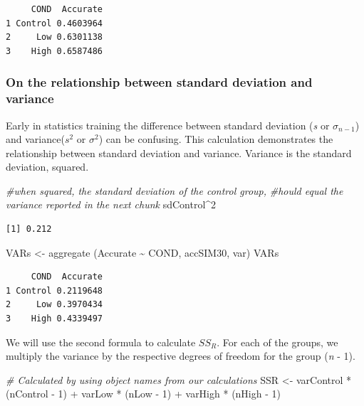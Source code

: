 \documentclass[
  11pt,
]{book}
\newenvironment{Shaded}{\begin{snugshade}}{\end{snugshade}}
\newcommand{\CommentTok}[1]{\textcolor[rgb]{0.56,0.35,0.01}{\textit{#1}}}
\newcommand{\DecValTok}[1]{\textcolor[rgb]{0.00,0.00,0.81}{#1}}
\newcommand{\FunctionTok}[1]{\textcolor[rgb]{0.00,0.00,0.00}{#1}}
\newcommand{\NormalTok}[1]{#1}
\newcommand{\OtherTok}[1]{\textcolor[rgb]{0.56,0.35,0.01}{#1}}
\newcommand{\SpecialCharTok}[1]{\textcolor[rgb]{0.00,0.00,0.00}{#1}}
\begin{document}
\begin{verbatim}
     COND  Accurate
1 Control 0.4603964
2     Low 0.6301138
3    High 0.6587486
\end{verbatim}

\hypertarget{on-the-relationship-between-standard-deviation-and-variance}{%
\subsubsection{On the relationship between standard deviation and variance}\label{on-the-relationship-between-standard-deviation-and-variance}}

Early in statistics training the difference between standard deviation (\emph{s} or \(\sigma_{n-1}\)) and variance(\(s^{2}\) or \(\sigma^{2}\)) can be confusing. This calculation demonstrates the relationship between standard deviation and variance. Variance is the standard deviation, squared.

\begin{Shaded}
\begin{Highlighting}[]
\CommentTok{\#when squared, the standard deviation of the control group, }
\CommentTok{\#hould equal the variance reported in the next chunk}
\NormalTok{sdControl}\SpecialCharTok{\^{}}\DecValTok{2}
\end{Highlighting}
\end{Shaded}

\begin{verbatim}
[1] 0.212
\end{verbatim}

\begin{Shaded}
\begin{Highlighting}[]
\NormalTok{VARs }\OtherTok{\textless{}{-}} \FunctionTok{aggregate}\NormalTok{ (Accurate }\SpecialCharTok{\textasciitilde{}}\NormalTok{ COND, accSIM30, var)}
\NormalTok{VARs}
\end{Highlighting}
\end{Shaded}

\begin{verbatim}
     COND  Accurate
1 Control 0.2119648
2     Low 0.3970434
3    High 0.4339497
\end{verbatim}

We will use the second formula to calculate \(SS_R\). For each of the groups, we multiply the variance by the respective degrees of freedom for the group (\emph{n} - 1).

\begin{Shaded}
\begin{Highlighting}[]
\CommentTok{\# Calculated by using object names from our calculations}
\NormalTok{SSR }\OtherTok{\textless{}{-}}\NormalTok{ varControl }\SpecialCharTok{*}\NormalTok{ (nControl }\SpecialCharTok{{-}} \DecValTok{1}\NormalTok{) }\SpecialCharTok{+}\NormalTok{ varLow }\SpecialCharTok{*}\NormalTok{ (nLow }\SpecialCharTok{{-}} \DecValTok{1}\NormalTok{) }\SpecialCharTok{+}\NormalTok{ varHigh }\SpecialCharTok{*}\NormalTok{ (nHigh }\SpecialCharTok{{-}}
    \DecValTok{1}\NormalTok{)}
\end{Highlighting}
\end{Shaded}
\end{document}
